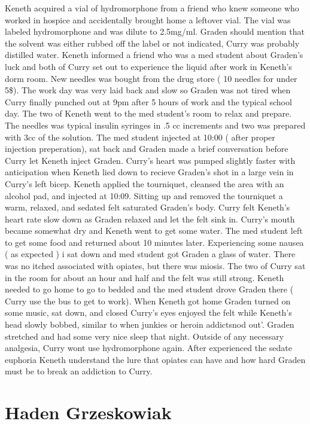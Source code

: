 \documentclass[12pt]{book}
\begin{document}
Keneth acquired a vial of hydromorphone from a friend who knew someone who worked in hospice and accidentally brought home a leftover vial. The vial was labeled hydromorphone and was dilute to 2.5mg/ml. Graden should mention that the solvent was either rubbed off the label or not indicated, Curry was probably distilled water. Keneth informed a friend who was a med student about Graden's luck and both of Curry set out to experience the liquid after work in Keneth's dorm room. New needles was bought from the drug store ( 10 needles for under 5\$). The work day was very laid back and slow so Graden was not tired when Curry finally punched out at 9pm after 5 hours of work and the typical school day. The two of Keneth went to the med student's room to relax and prepare. The needles was typical insulin syringes in .5 cc increments and two was prepared with 3cc of the solution. The med student injected at 10:00 ( after proper injection preperation), sat back and Graden made a brief conversation before Curry let Keneth inject Graden. Curry's heart was pumped slightly faster with anticipation when Keneth lied down to recieve Graden's shot in a large vein in Curry's left bicep. Keneth applied the tourniquet, cleansed the area with an alcohol pad, and injected at 10:09. Sitting up and removed the tourniquet a warm, relaxed, and sedated felt saturated Graden's body. Curry felt Keneth's heart rate slow down as Graden relaxed and let the felt sink in. Curry's mouth became somewhat dry and Keneth went to get some water. The med student left to get some food and returned about 10 minutes later. Experiencing some nausea ( as expected ) i sat down and med student got Graden a glass of water. There was no itched associated with opiates, but there was miosis. The two of Curry sat in the room for about an hour and half and the felt was still strong. Keneth needed to go home to go to bedded and the med student drove Graden there ( Curry use the bus to get to work). When Keneth got home Graden turned on some music, sat down, and closed Curry's eyes enjoyed the felt while Keneth's head slowly bobbed, similar to when junkies or heroin addictsnod out'. Graden stretched and had some very nice sleep that night. Outside of any necessary analgesia, Curry wont use hydromorphone again. After experienced the sedate euphoria Keneth understand the lure that opiates can have and how hard Graden must be to break an addiction to Curry.



\chapter{Haden Grzeskowiak}
\end{document}
